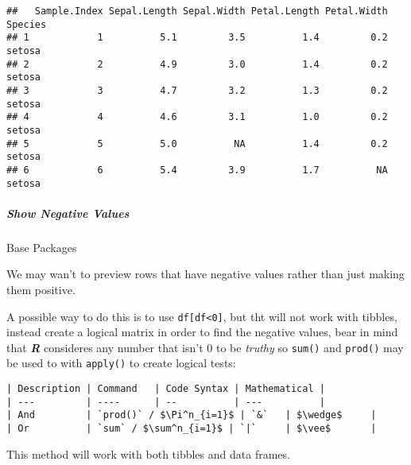 \documentclass[
]{article}
\begin{document}
\begin{verbatim}
##   Sample.Index Sepal.Length Sepal.Width Petal.Length Petal.Width Species
## 1            1          5.1         3.5          1.4         0.2  setosa
## 2            2          4.9         3.0          1.4         0.2  setosa
## 3            3          4.7         3.2          1.3         0.2  setosa
## 4            4          4.6         3.1          1.0         0.2  setosa
## 5            5          5.0          NA          1.4         0.2  setosa
## 6            6          5.4         3.9          1.7          NA  setosa
\end{verbatim}

\hypertarget{show-negative-values}{%
\subparagraph{Show Negative Values}\label{show-negative-values}}

Base Packages

We may wan't to preview rows that have negative values rather than just
making them positive.

A possible way to do this is to use \texttt{df{[}df\textless{}0{]}}, but
tht will not work with tibbles, instead create a logical matrix in order
to find the negative values, bear in mind that \textbf{\emph{R}}
consideres any number that isn't 0 to be \emph{truthy} so \texttt{sum()}
and \texttt{prod()} may be used to with \texttt{apply()} to create
logical tests:

\begin{verbatim}
| Description | Command   | Code Syntax | Mathematical |
| ---         | ----      | --          | ---          |
| And         | `prod()` / $\Pi^n_{i=1}$ | `&`   | $\wedge$     |
| Or          | `sum` / $\sum^n_{i=1}$ | `|`     | $\vee$       |
\end{verbatim}

This method will work with both tibbles and data frames.
\end{document}
